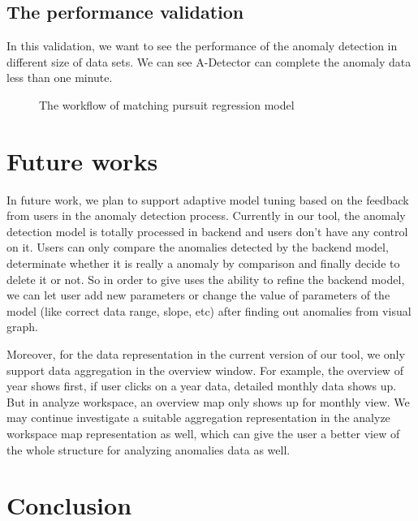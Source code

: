 \documentclass{vgtc}                          %
\begin{document}
\subsection{The performance validation}
In this validation, we want to see the performance of the anomaly detection in different size of data sets. We can see A-Detector can complete the anomaly data less than one minute. 

\begin{figure}[htb]
\begin{center}
\end{center}
	\caption{The workflow of matching pursuit regression model}
\end{figure} 

\section{Future works}

In future work, we plan to support adaptive model tuning based on the feedback from users in the anomaly detection process. Currently in our tool, the anomaly detection model is totally processed in backend and users don’t have any control on it. Users can only compare the anomalies detected by the backend model, determinate whether it is really a anomaly by comparison and finally decide to delete it or not. So in order to give uses the ability to refine the backend model, we can let user add new parameters or change the value of parameters of the model (like correct data range, slope, etc) after finding out anomalies from visual graph.

      Moreover, for the data representation in the current version of our tool, we only support data aggregation in the overview window. For example, the overview of year shows first, if user clicks on a year data, detailed monthly data shows up. But in analyze workspace, an overview map only shows up for monthly view.  We may continue investigate a suitable aggregation representation in the analyze workspace map representation as well, which can give the user a better view of the whole structure for analyzing anomalies data as well.  
\section{Conclusion}
\end{document}
